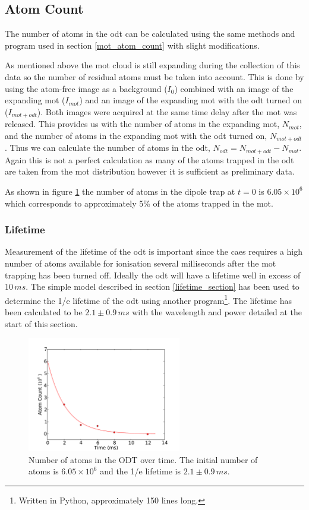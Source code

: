 \subsection{Atom Count}
The number of atoms in the \gls{odt} can be calculated using the same methods and program used in section \ref{mot_atom_count} with slight modifications.

As mentioned above the \gls{mot} cloud is still expanding during the collection of this data so the number of residual atoms must be taken into account. This is done by using the atom-free image as a background ($I_0$) combined with an image of the expanding \gls{mot} ($I_{mot}$) and an image of the expanding \gls{mot} with the \gls{odt} turned on ($I_{mot+odt}$). Both images were acquired at the same time delay after the \gls{mot} was released. This provides us with the number of atoms in the expanding \gls{mot}, $N_{mot}$, and the number of atoms in the expanding \gls{mot} with the \gls{odt} turned on, $N_{mot+odt}$. Thus we can calculate the number of atoms in the \gls{odt}, $N_{odt}=N_{mot+odt}-N_{mot}$. Again this is not a perfect calculation as many of the atoms trapped in the \gls{odt} are taken from the \gls{mot} distribution however it is sufficient as preliminary data.

As shown in figure \ref{fig:lifetime} the number of atoms in the dipole trap at $t=0$ is $6.05\times10^6$ which corresponds to approximately 5\% of the atoms trapped in the \gls{mot}.

\subsubsection{Lifetime}
Measurement of the lifetime of the \gls{odt} is important since the \gls{caes} requires a high number of atoms available for ionisation several milliseconds after the \gls{mot} trapping has been turned off. Ideally the \gls{odt} will have a lifetime well in excess of $10\,\unit{ms}$. The simple model described in section \ref{lifetime_section} has been used to determine the 1/e lifetime of the \gls{odt} using another program\footnote{Written in Python, approximately 150 lines long.}. The lifetime has been calculated to be $2.1\pm0.9\,\unit{ms}$ with the wavelength and power detailed at the start of this section.

\begin{figure}[h]
\centering
\includegraphics[width=0.6\textwidth]{figs/lifetime.pdf}
\caption{Number of atoms in the ODT over time. The initial number of atoms is $6.05\times10^6$ and the 1/e lifetime is $2.1\pm0.9\,\unit{ms}$.}
\label{fig:lifetime}
\end{figure}


